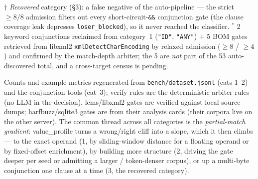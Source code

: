 \documentclass[11pt]{article}
\begin{document}
\noindent\footnotesize $\dagger$ \emph{Recovered} category (\S3): a false negative
of the auto-pipeline --- the strict $\ge 8/8$ admission filters out every
short-circuit-\texttt{\&\&} conjunction gate (the clause coverage leak depresses
\texttt{loser\_blocked}), so it never reached the classifier.
$^{*}$ 2 keyword conjunctions reclaimed from category~1 (\texttt{"ID"},
\texttt{"ANY"}) $+$ 5 BOM gates retrieved from libxml2 \texttt{xmlDetectCharEncoding}
by relaxed admission ($\ge 8$ / $\ge 4$) and confirmed by the match-depth arbiter;
the 5 are \emph{not} part of the 53 auto-discovered total, and a cross-target
census is pending.

\medskip\noindent\footnotesize Counts and example metrics regenerated from
\texttt{bench/dataset.jsonl} (cats 1--2) and the conjunction tools (cat~3);
verify rules are the deterministic arbiter rules (no LLM in the decision).
lcms/libxml2 gates are verified against local source dumps; harfbuzz/sqlite3
gates are from their analysis cards (their corpora live on the other server). The
common thread across all categories is the \emph{partial-match gradient}:
value\_profile turns a wrong/right cliff into a slope, which it then climbs ---
to the exact operand (1, by sliding-window distance for a floating operand or by
fixed-offset enrichment), by building more structure (2, driving the gate deeper
per seed or admitting a larger / token-denser corpus), or up a multi-byte
conjunction one clause at a time (3, the recovered category).
\end{document}
